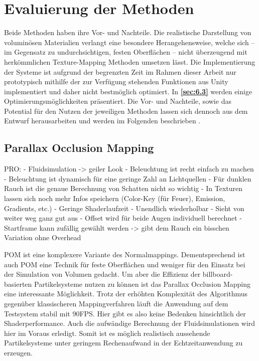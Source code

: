\section{Evaluierung der Methoden}
\label{sec:5}

Beide Methoden haben ihre Vor- und Nachteile. Die realistische Darstellung von voluminösen Materialien verlangt 
eine besondere Herangehensweise, welche sich – im Gegensatz zu undurchsichtigen, festen Oberflächen – 
nicht überzeugend mit herkömmlichen Texture-Mapping Methoden umsetzen lässt. 
Die Implementierung der Systeme ist aufgrund der begrenzten Zeit im Rahmen dieser Arbeit nur prototypisch mithilfe der 
zur Verfügung stehenden Funktionen aus Unity implementiert und daher nicht bestmöglich optimiert. 
In \textbf{\autoref{sec:6.3}} werden einige Optimierungsmöglichkeiten präsentiert. 
Die Vor- und Nachteile, sowie das Potential für den Nutzen der jeweiligen Methoden lassen sich dennoch aus dem Entwurf 
herausarbeiten und werden im Folgenden beschrieben . 


\subsection{Parallax Occlusion Mapping}
\label{sec:5.1}

PRO: \newline
- Fluidsimulation -> geiler Look\newline
- Beleuchtung ist recht einfach zu machen \newline
- Beleuchtung ist dynamisch für eine geringe Zahl an Lichtquellen
- Für dunklen Rauch ist die genaue Berechnung von Schatten nicht so wichtig
- In Texturen lassen sich noch mehr Infos speichern (Color-Key (für Feuer), Emission, Gradients, etc.) \newline
- Geringe Shaderlaufzeit\newline
- Unendlich wiederholbar\newline
- Sieht von weiter weg ganz gut aus\newline
- Offset wird für beide Augen individuell berechnet\newline
- Startframe kann zufällig gewählt werden -> gibt dem Rauch ein bisschen Variation ohne Overhead


POM ist eine komplexere Variante des Normalmappings. Dementsprechend ist auch POM eine Technik für feste Oberflächen und weniger
für den Einsatz bei der Simulation von Volumen gedacht. Um aber die Effizienz der billboard-basierten Partikelsysteme 
nutzen zu können ist das Parallax Occlusion Mapping eine interessante Möglichkeit. Trotz der erhöhten Komplexität des Algorithmus
gegenüber klassischeren Mappingverfahren läuft die Anwendung auf dem Testsystem stabil mit 90FPS. Hier gibt es also keine 
Bedenken hinsichtlich der Shaderperformance. Auch die aufwändige Berechnung der Fluidsimulationen wird hier im Voraus erledigt. Somit
ist es möglich realistisch aussehende Partikelsysteme unter geringem Rechenaufwand in der Echtzeitanwendung zu erzeugen.
 

